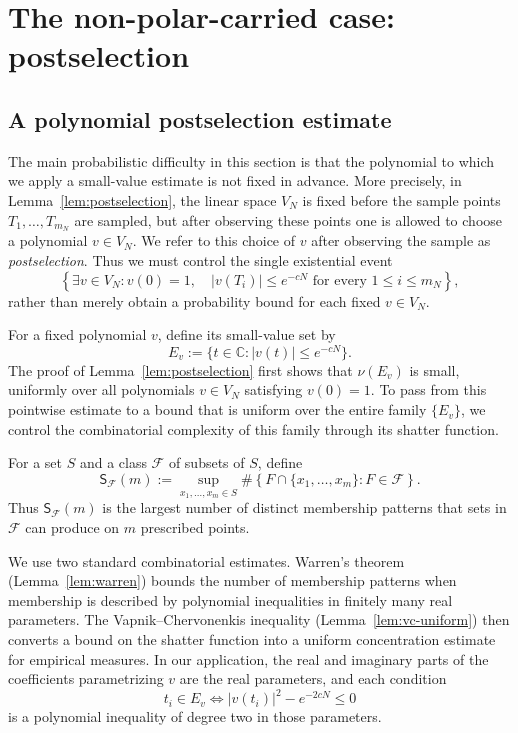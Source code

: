 \documentclass[10pt,reqno]{amsart}
\theoremstyle{remark}
\newcommand{\C}{\mathbb C}
\begin{document}
\section{The non-polar-carried case: postselection}\label{sec:non-polar}
\subsection{A polynomial postselection estimate}
The main probabilistic difficulty in this section is that the polynomial to which we apply a small-value estimate is not fixed in advance. More precisely, in Lemma~\ref{lem:postselection}, the linear space $V_N$ is fixed before the sample points $T_1,\ldots,T_{m_N}$ are sampled, but after observing these points one is allowed to choose a polynomial $v\in V_N$. We refer to this choice of $v$ after observing the sample as \emph{postselection}. Thus we must control the single existential event
\[\left\{\exists v\in V_N:v(0)=1,\quad|v(T_i)|\leq e^{-cN}\text{ for every }1\leq i\leq m_N\right\},\]
rather than merely obtain a probability bound for each fixed $v\in V_N$.

For a fixed polynomial $v$, define its small-value set by
\[E_v:=\{t\in\C:|v(t)|\leq e^{-cN}\}.\]
The proof of Lemma~\ref{lem:postselection} first shows that $\nu(E_v)$ is small, uniformly over all polynomials $v\in V_N$ satisfying $v(0)=1$. To pass from this pointwise estimate to a bound that is uniform over the entire family $\{E_v\}$, we control the combinatorial complexity of this family through its shatter function.

For a set $S$ and a class $\mathcal F$ of subsets of $S$, define
\[\mathsf S_{\mathcal F}(m):=\sup_{x_1,\ldots,x_m\in S}\# \left\{F\cap\{x_1,\ldots,x_m\}:F\in\mathcal F\right\}.\]
Thus $\mathsf S_{\mathcal F}(m)$ is the largest number of distinct membership patterns that sets in $\mathcal F$ can produce on $m$ prescribed points.

We use two standard combinatorial estimates. Warren's theorem (Lemma~\ref{lem:warren}) bounds the number of membership patterns when membership is described by polynomial inequalities in finitely many real parameters. The Vapnik--Chervonenkis inequality (Lemma~\ref{lem:vc-uniform}) then converts a bound on the shatter function into a uniform concentration estimate for empirical measures. In our application, the real and imaginary parts of the coefficients parametrizing \(v\) are the real parameters, and each condition
\[t_i\in E_v\iff|v(t_i)|^2-e^{-2cN}\leq 0\]
is a polynomial inequality of degree two in those parameters.
\end{document}
